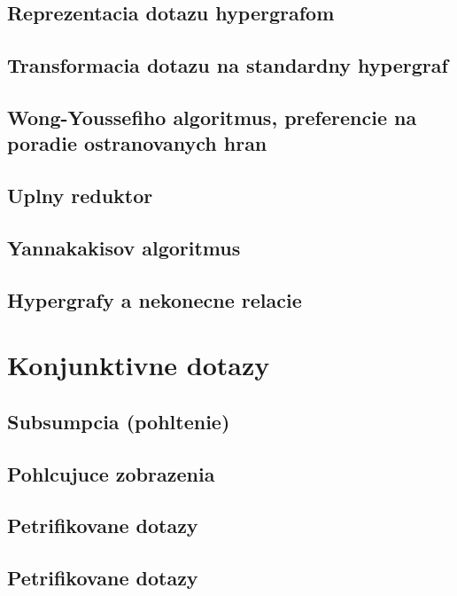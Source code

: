 \documentclass[12pt,a4paper]{article}
\begin{document}
\subsection{Reprezentacia dotazu hypergrafom}

\subsection{Transformacia dotazu na standardny hypergraf}

\subsection{Wong-Youssefiho algoritmus, preferencie na poradie ostranovanych hran}

\subsection{Uplny reduktor}

\subsection{Yannakakisov algoritmus}

\subsection{Hypergrafy a nekonecne relacie}

\section{Konjunktivne dotazy}

\subsection{Subsumpcia (pohltenie)}

\subsection{Pohlcujuce zobrazenia}

\subsection{Petrifikovane dotazy}

\subsection{Petrifikovane dotazy}
\end{document}
